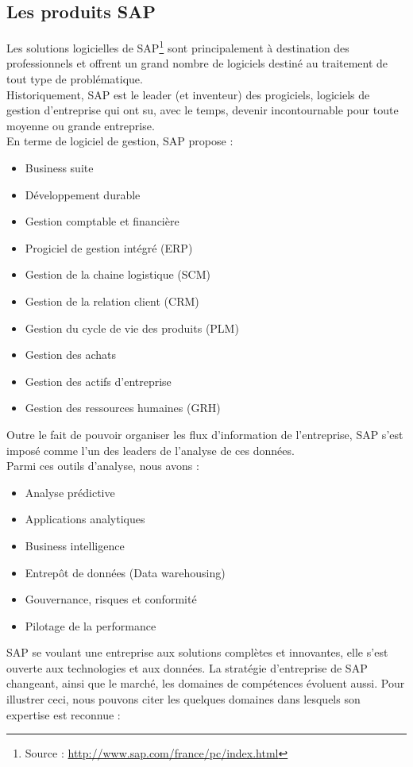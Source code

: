 \subsection{Les produits SAP}
Les solutions logicielles de SAP\footnote{Source : \url{http://www.sap.com/france/pc/index.html}} sont principalement à destination des professionnels et offrent un grand nombre de logiciels destiné au traitement de tout type de problématique.\\
Historiquement, SAP est le leader (et inventeur) des progiciels, logiciels de gestion d'entreprise qui ont su, avec le temps, devenir incontournable pour toute moyenne ou grande entreprise.\\
En terme de logiciel de gestion, SAP propose :
\begin{itemize}
	\item Business suite
	\item Développement durable
	\item Gestion comptable et financière
	\item Progiciel de gestion intégré (ERP)
	\item Gestion de la chaine logistique (SCM)
	\item Gestion de la relation client (CRM)
	\item Gestion du cycle de vie des produits (PLM)
	\item Gestion des achats
	\item Gestion des actifs d'entreprise
	\item Gestion des ressources humaines (GRH)
\end{itemize}

Outre le fait de pouvoir organiser les flux d'information de l'entreprise, SAP s'est imposé comme l'un des leaders de l'analyse de ces données.\\
Parmi ces outils d'analyse, nous avons :
\begin{itemize}
	\item Analyse prédictive
	\item Applications analytiques
	\item Business intelligence
	\item Entrepôt de données (Data warehousing)
	\item Gouvernance, risques et conformité
	\item Pilotage de la performance
\end{itemize}

SAP se voulant une entreprise aux solutions complètes et innovantes, elle s'est ouverte aux technologies et aux données. La stratégie d'entreprise de SAP changeant, ainsi que le marché, les domaines de compétences évoluent aussi. Pour illustrer ceci, nous pouvons citer les quelques domaines dans lesquels son expertise est reconnue :

